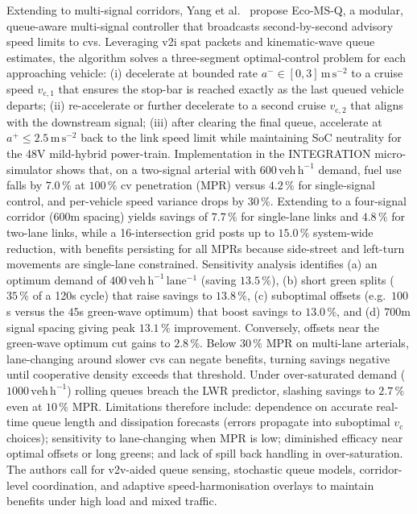 \mynewline
Extending to multi-signal corridors, Yang et al.\ \cite{Yang2021} propose Eco-MS-Q, a modular, queue-aware multi-signal controller that broadcasts second-by-second advisory speed limits to \acp{cv}. Leveraging \ac{v2i} \ac{spat} packets and kinematic-wave queue estimates, the algorithm solves a three-segment optimal-control problem for each approaching vehicle: (i) decelerate at bounded rate $a^{-}\!\in[0,3]\,\mathrm{m\,s^{-2}}$ to a cruise speed $v_{\mathrm c,1}$ that ensures the stop-bar is reached exactly as the last queued vehicle departs; (ii) re-accelerate or further decelerate to a second cruise $v_{\mathrm c,2}$ that aligns with the downstream signal; (iii) after clearing the final queue, accelerate at $a^{+}\!\le 2.5\,\mathrm{m\,s^{-2}}$ back to the link speed limit while maintaining \mbox{SoC} neutrality for the 48V mild-hybrid power-train. Implementation in the INTEGRATION micro-simulator shows that, on a two-signal arterial with $600\,\mathrm{veh\,h^{-1}}$ demand, fuel use falls by $7.0\,\%$ at $100\,\%$ \ac{cv} penetration (MPR) versus $4.2\,\%$ for single-signal control, and per-vehicle speed variance drops by $30\,\%$.  Extending to a four-signal corridor (600m spacing) yields savings of $7.7\,\%$ for single-lane links and $4.8\,\%$ for two-lane links, while a 16-intersection grid posts up to $15.0\,\%$ system-wide reduction, with benefits persisting for all MPRs because side-street and left-turn movements are single-lane constrained.  Sensitivity analysis identifies (a) an optimum demand of $400\,\mathrm{veh\,h^{-1}\,lane^{-1}}$ (saving $13.5\,\%$), (b) short green splits ($35\,\%$ of a 120s cycle) that raise savings to $13.8\,\%$, (c) suboptimal offsets (e.g.\ $100$s versus the $45$s green-wave optimum) that boost savings to $13.0\,\%$, and (d) $700$m signal spacing giving peak $13.1\,\%$ improvement. Conversely, offsets near the green-wave optimum cut gains to $2.8\,\%$.  Below $30\,\%$ MPR on multi-lane arterials, lane-changing around slower \acp{cv} can negate benefits, turning savings negative until cooperative density exceeds that threshold. Under over-saturated demand ($1000\,\mathrm{veh\,h^{-1}}$) rolling queues breach the LWR predictor, slashing savings to $2.7\,\%$ even at $10\,\%$ MPR.  Limitations therefore include: dependence on accurate real-time queue length and dissipation forecasts (errors propagate into suboptimal $v_{\mathrm c}$ choices); sensitivity to lane-changing when MPR is low; diminished efficacy near optimal offsets or long greens; and lack of spill back handling in over-saturation. The authors call for \ac{v2v}-aided queue sensing, stochastic queue models, corridor-level coordination, and adaptive speed-harmonisation overlays to maintain benefits under high load and mixed traffic.
